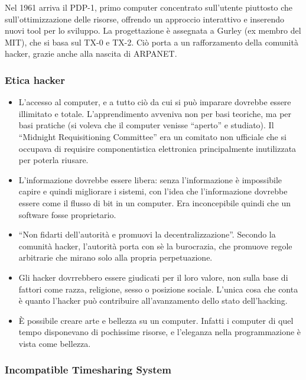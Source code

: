 Nel 1961 arriva il PDP-1, primo computer concentrato sull'utente piuttosto che sull'ottimizzazione delle risorse, offrendo un approccio interattivo e inserendo nuovi tool per lo sviluppo. La progettazione \`e assegnata a Gurley (ex membro del MIT), che si basa sul TX-0 e TX-2. Ci\`o porta a un rafforzamento della comunit\`a hacker, grazie anche alla nascita di ARPANET.

\subsubsection{Etica hacker}

\begin{itemize}
  
\item L'accesso al computer, e a tutto ci\`o da cui si pu\`o imparare dovrebbe essere illimitato e totale. L'apprendimento avveniva non per basi teoriche, ma per basi pratiche (si voleva che il computer venisse ``aperto'' e studiato). Il ``Midnight Requisitioning Committee'' era un comitato non ufficiale che si occupava di requisire componentistica elettronica principalmente inutilizzata per poterla riusare.

\item L'informazione dovrebbe essere libera: senza l'informazione \`e impossibile capire e quindi migliorare i sistemi, con l'idea che l'informazione dovrebbe essere come il flusso di bit in un computer. Era inconcepibile quindi che un software fosse proprietario.

\item ``Non fidarti dell'autorit\`a e promuovi la decentralizzazione''. Secondo la comunit\`a hacker, l'autorit\`a porta con s\`e la burocrazia, che promuove regole arbitrarie che mirano solo alla propria perpetuazione.

\item Gli hacker dovrrebbero essere giudicati per il loro valore, non sulla base di fattori come razza, religione, sesso o posizione sociale. L'unica cosa che conta \`e quanto l'hacker pu\`o contribuire all'avanzamento dello stato dell'hacking.

\item \`E possibile creare arte e bellezza su un computer. Infatti i computer di quel tempo disponevano di pochissime risorse, e l'eleganza nella programmazione \`e vista come bellezza.

\end{itemize}
 
\subsubsection{Incompatible Timesharing System}

